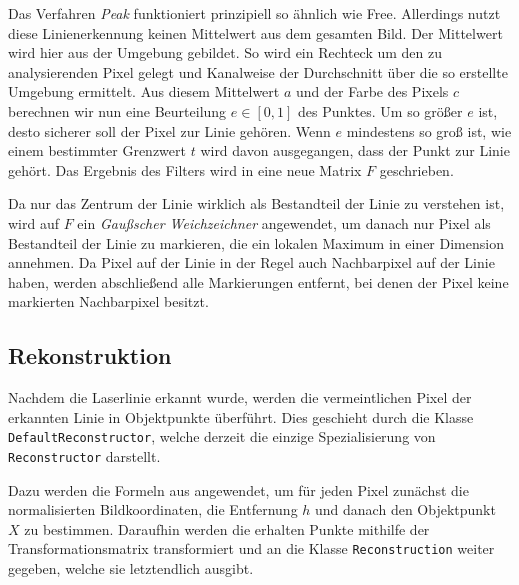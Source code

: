 \documentclass[ngerman,a4paper,parskip=half]{scrartcl}
\begin{document}
Das Verfahren \emph{Peak} funktioniert prinzipiell so ähnlich wie Free. Allerdings nutzt diese Linienerkennung keinen Mittelwert aus dem gesamten Bild. Der Mittelwert wird hier aus der Umgebung gebildet. So wird ein Rechteck um den zu analysierenden Pixel gelegt und Kanalweise der Durchschnitt über die so erstellte Umgebung ermittelt. Aus diesem Mittelwert $a$ und der Farbe des Pixels $c$ berechnen wir nun eine Beurteilung $e \in [0, 1]$ des Punktes. Um so größer $e$ ist, desto sicherer soll der Pixel zur Linie gehören. Wenn $e$ mindestens so groß ist, wie einem bestimmter Grenzwert $t$ wird davon ausgegangen, dass der Punkt zur Linie gehört. Das Ergebnis des Filters wird in eine neue Matrix $F$ geschrieben.

Da nur das Zentrum der Linie wirklich als Bestandteil der Linie zu verstehen ist, wird auf $F$ ein \emph{Gaußscher Weichzeichner} angewendet, um danach nur Pixel als Bestandteil der Linie zu markieren, die ein lokalen Maximum in einer Dimension annehmen. Da Pixel auf der Linie in der Regel auch Nachbarpixel auf der Linie haben, werden abschließend alle Markierungen entfernt, bei denen der Pixel keine markierten Nachbarpixel besitzt.

\subsection{Rekonstruktion}

Nachdem die Laserlinie erkannt wurde, werden die vermeintlichen Pixel der erkannten Linie in Objektpunkte überführt. Dies geschieht durch die Klasse \texttt{DefaultReconstructor}, welche derzeit die einzige Spezialisierung von \texttt{Reconstructor} darstellt.

Dazu werden die Formeln aus  angewendet, um für jeden Pixel zunächst die normalisierten Bildkoordinaten, die Entfernung $h$ und danach den Objektpunkt $X$ zu bestimmen. Daraufhin werden die erhalten Punkte mithilfe der Transformationsmatrix transformiert und an die Klasse \texttt{Reconstruction} weiter gegeben, welche sie letztendlich ausgibt.
	
\end{document}
